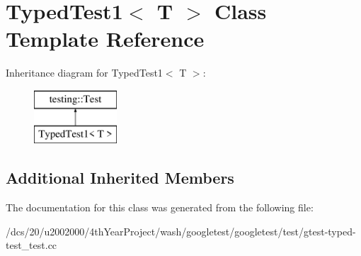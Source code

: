 \hypertarget{classTypedTest1}{}\section{Typed\+Test1$<$ T $>$ Class Template Reference}
\label{classTypedTest1}
Inheritance diagram for Typed\+Test1$<$ T $>$\+:\begin{figure}[H]
\begin{center}
\leavevmode
\includegraphics[height=2.000000cm]{classTypedTest1}
\end{center}
\end{figure}
\subsection*{Additional Inherited Members}


The documentation for this class was generated from the following file\+:\begin{DoxyCompactItemize}
\item 
/dcs/20/u2002000/4th\+Year\+Project/wash/googletest/googletest/test/gtest-\/typed-\/test\+\_\+test.\+cc\end{DoxyCompactItemize}
